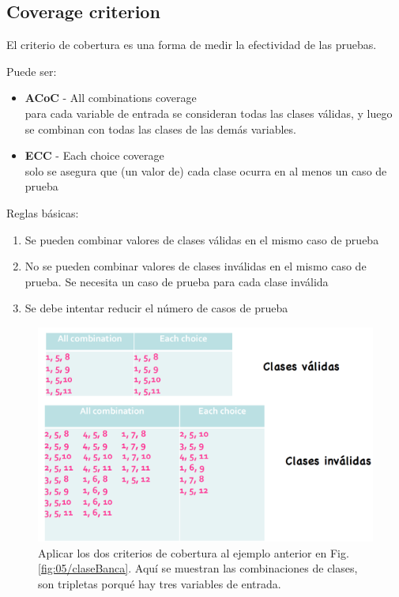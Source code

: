 \subsection{Coverage criterion}
El criterio de cobertura es una forma de medir la efectividad de las pruebas.
{Puede ser:\ns
\begin{itemize}
   \item \textbf{ACoC} - All combinations coverage\\
   para cada variable de entrada se consideran todas las clases válidas, y luego se combinan con todas las clases de las demás variables.
   \item \textbf{ECC} - Each choice coverage\\
   solo se asegura que (un valor de) cada clase ocurra en al menos un caso de prueba
\end{itemize}

Reglas básicas:
\begin{enumerate}
	\item Se pueden combinar valores de clases válidas en el mismo caso de prueba
	\item No se pueden combinar valores de clases inválidas en el mismo caso de prueba. Se necesita un caso de prueba para cada clase inválida
	\item Se debe intentar reducir el número de casos de prueba
\end{enumerate}
}

\begin{figure}[htbp]
   \centering
   \includegraphics{images/05/criterioCobertura.png}
   \caption{Aplicar los dos criterios de cobertura al ejemplo anterior en Fig. 
   \ref{fig:05/claseBanca}. Aquí se muestran las combinaciones de clases, son tripletas porqué hay tres variables de entrada.}
   \label{fig:05/criterioCobertura}
\end{figure}


